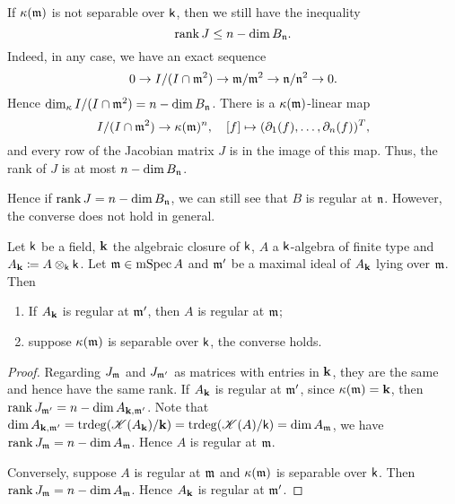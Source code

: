     \begin{remark}\label{rmk: rank of Jacobian matrix for inseparable extensions}
        If \({\kappa}({\mathfrak{m}})\) is not separable over \({\mathsf{k}}\), then we still have the inequality
        \[ \operatorname{rank} J \leq n - \dim B_{\mathfrak{n}}. \]
        Indeed, in any case, we have an exact sequence
        \[ 0 \to I/(I\cap {\mathfrak{m}}^2) \to {\mathfrak{m}}/{\mathfrak{m}}^2 \to {\mathfrak{n}}/{\mathfrak{n}}^2 \to 0. \]
        Hence \(\dim_{\kappa} I/(I\cap {\mathfrak{m}}^2) = n - \dim B_{\mathfrak{n}}\).
        There is a \({\kappa}({\mathfrak{m}})\)-linear map
        \[ I/(I\cap {\mathfrak{m}}^2) \to {\kappa}({\mathfrak{m}})^n, \quad [f] \mapsto (\partial_1(f), \ldots, \partial_n(f))^T, \]
        and every row of the Jacobian matrix \(J\) is in the image of this map.
        Thus, the rank of \(J\) is at most \(n - \dim B_{\mathfrak{n}}\).

        Hence if \(\operatorname{rank} J = n - \dim B_{\mathfrak{n}}\), we can still see that \(B\) is regular at \({\mathfrak{n}}\).
        However, the converse does not hold in general.
    \end{remark}

    \begin{proposition}\label{prop: regularity under base field extension}
        Let \({\mathsf{k}}\) be a field, \({\mathbf{k}}\) the algebraic closure of \({\mathsf{k}}\), \(A\) a \({\mathsf{k}}\)-algebra of finite type and \(A_{\mathbf{k}} \coloneqq A \otimes_{{\mathsf{k}}} {\mathsf{k}}\).
        Let \({\mathfrak{m}} \in \operatorname{mSpec} A\) and \({\mathfrak{m}}'\) be a maximal ideal of \(A_{\mathbf{k}}\) lying over \({\mathfrak{m}}\).
        Then 
        \begin{enumerate}
            \item If \(A_{\mathbf{k}}\) is regular at \({\mathfrak{m}}'\), then \(A\) is regular at \({\mathfrak{m}}\);
            \item suppose \({\kappa}({\mathfrak{m}})\) is separable over \({\mathsf{k}}\), the converse holds.
        \end{enumerate}
    \end{proposition}
    \begin{proof}
        Regarding \(J_{\mathfrak{m}}\) and \(J_{{\mathfrak{m}}'}\) as matrices with entries in \({\mathbf{k}}\), they are the same and hence have the same rank.
        If \(A_{\mathbf{k}}\) is regular at \({\mathfrak{m}}'\), since \({\kappa}({\mathfrak{m}}) = {\mathbf{k}}\), then \(\operatorname{rank} J_{{\mathfrak{m}}'} = n - \dim A_{{\mathbf{k}},{\mathfrak{m}}'}\).
        Note that \(\dim A_{{\mathbf{k}},{\mathfrak{m}}'} = \operatorname{trdeg}({\mathscr{K}}(A_{\mathbf{k}})/{\mathbf{k}}) = \operatorname{trdeg}({\mathscr{K}}(A)/{\mathsf{k}}) = \dim A_{\mathfrak{m}}\), we have \(\operatorname{rank} J_{{\mathfrak{m}}} = n - \dim A_{\mathfrak{m}}\).
        Hence \(A\) is regular at \({\mathfrak{m}}\).

        Conversely, suppose \(A\) is regular at \({\mathfrak{m}}\) and \({\kappa}({\mathfrak{m}})\) is separable over \({\mathsf{k}}\).
        Then \(\operatorname{rank} J_{\mathfrak{m}} = n - \dim A_{\mathfrak{m}}\).
        Hence \(A_{\mathbf{k}}\) is regular at \({\mathfrak{m}}'\).
    \end{proof}

